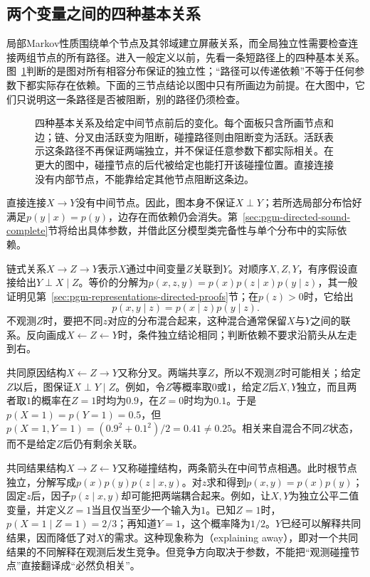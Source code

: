 \subsection{两个变量之间的四种基本关系}
\label{sec:pgm-directed-motifs}

局部Markov性质围绕单个节点及其邻域建立屏蔽关系，而全局独立性需要检查连接两组节点的所有路径。进入一般定义以前，先看一条短路径上的四种基本关系。图~\ref{fig:pgm-directed-motifs}判断的是图对所有相容分布保证的独立性；“路径可以传递依赖”不等于任何参数下都实际存在依赖。下面的三节点结论以图中只有所画边为前提。在大图中，它们只说明这一条路径是否被阻断，别的路径仍须检查。

\begin{figure}[htbp]
  \centering
  
  \caption{四种基本关系及给定中间节点前后的变化。每个面板只含所画节点和边；链、分叉由活跃变为阻断，碰撞路径则由阻断变为活跃。活跃表示这条路径不再保证两端独立，并不保证任意参数下都实际相关。在更大的图中，碰撞节点的后代被给定也能打开该碰撞位置。直接连接没有内部节点，不能靠给定其他节点阻断这条边。}
  \label{fig:pgm-directed-motifs}
\end{figure}

直接连接$X\to Y$没有中间节点。因此，图本身不保证$X\perp Y$；若所选局部分布恰好满足$p(y\mid x)=p(y)$，边存在而依赖仍会消失。第~\ref{sec:pgm-directed-sound-complete}节将给出具体参数，并借此区分模型类完备性与单个分布中的实际依赖。

链式关系$X\to Z\to Y$表示$X$通过中间变量$Z$关联到$Y$。对顺序$X,Z,Y$，有序假设直接给出$Y\perp X\mid Z$。等价的分解为$p(x,z,y)=p(x)p(z\mid x)p(y\mid z)$，其一般证明见第~\ref{sec:pgm-representations-directed-proofs}节；在$p(z)>0$时，它给出
\[
  p(x,y\mid z)=p(x\mid z)p(y\mid z).
\]
不观测$Z$时，要把不同$z$对应的分布混合起来，这种混合通常保留$X$与$Y$之间的联系。反向画成$X\leftarrow Z\leftarrow Y$时，条件独立结论相同；判断依赖不要求沿箭头从左走到右。

共同原因结构$X\leftarrow Z\to Y$又称分叉。两端共享$Z$，所以不观测$Z$时可能相关；给定$Z$以后，图保证$X\perp Y\mid Z$。例如，令$Z$等概率取$0$或$1$，给定$Z$后$X,Y$独立，而且两者取$1$的概率在$Z=1$时均为$0.9$，在$Z=0$时均为$0.1$。于是$p(X=1)=p(Y=1)=0.5$，但$p(X=1,Y=1)=(0.9^2+0.1^2)/2=0.41\ne0.25$。相关来自混合不同$Z$状态，而不是给定$Z$后仍有剩余关联。

共同结果结构$X\to Z\leftarrow Y$又称碰撞结构，两条箭头在中间节点相遇。此时根节点独立，分解写成$p(x)p(y)p(z\mid x,y)$。对$z$求和得到$p(x,y)=p(x)p(y)$；固定$z$后，因子$p(z\mid x,y)$却可能把两端耦合起来。例如，让$X,Y$为独立公平二值变量，并定义$Z=1$当且仅当至少一个输入为$1$。已知$Z=1$时，$p(X=1\mid Z=1)=2/3$；再知道$Y=1$，这个概率降为$1/2$。$Y$已经可以解释共同结果，因而降低了对$X$的需求。这种现象称为（explaining away），即对一个共同结果的不同解释在观测后发生竞争。但竞争方向取决于参数，不能把“观测碰撞节点”直接翻译成“必然负相关”。

